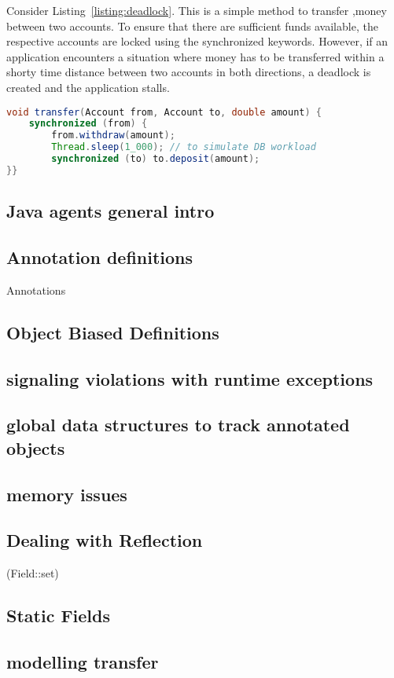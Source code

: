\documentclass[../JDala.tex]{subfiles}
\begin{document}
Consider Listing~\ref{listing:deadlock}.  This is a simple method to transfer ,money between two accounts. To ensure that there are sufficient funds available, the respective accounts are locked using the  synchronized keywords.  However, if an application encounters a situation where money has to be transferred within a shorty time distance between two accounts in both directions, a deadlock is created and the application stalls.

\begin{lstlisting}[language=Java, caption=Money transfer implementation prone to deadlock, label=listing:deadlock]
void transfer(Account from, Account to, double amount) {
	synchronized (from) {
		from.withdraw(amount);
		Thread.sleep(1_000); // to simulate DB workload
		synchronized (to) to.deposit(amount);
}}
\end{lstlisting}



	
\subsection{Java agents general intro}

\subsection{Annotation definitions}

Annotations

\subsection{Object Biased Definitions}

\subsection{signaling violations with runtime exceptions}

\subsection{global data structures to track annotated objects}

\subsection{memory issues}

\subsection{Dealing with Reflection}
(Field::set)

\subsection{Static Fields}

\subsection{modelling transfer}
\end{document}
